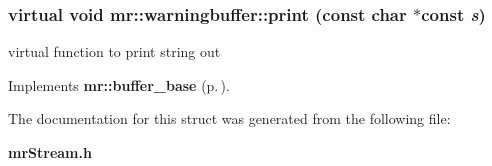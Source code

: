 \subsubsection{\setlength{\rightskip}{0pt plus 5cm}virtual void mr::warningbuffer::print (const char $\ast$const {\em s})\hspace{0.3cm}{\tt  [inline, virtual]}}\label{structmr_1_1warningbuffer_a1}


virtual function to print string out 



Implements {\bf mr::buffer\_\-base} {\rm (p.\,\pageref{structmr_1_1buffer__base_a3})}.

The documentation for this struct was generated from the following file:\begin{CompactItemize}
\item 
{\bf mr\-Stream.h}\end{CompactItemize}
